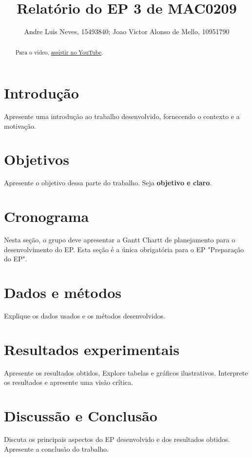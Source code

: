 \documentclass{article}
\title{Relatório do EP 3 de MAC0209}
\author{Andre Luis Neves, 15493840; Joao Victor Alonso de Mello, 10951790}
\begin{document}
\maketitle


\begin{abstract}

Para o video, \href{https://youtube.com}{assistir no YouTube}.

\end{abstract}

\newpage

\tableofcontents

\newpage

\section{Introdução}

Apresente uma introdução ao trabalho desenvolvido, fornecendo o contexto e a motivação.

\section{Objetivos}

Apresente o objetivo dessa parte do trabalho. Seja {\bf objetivo e claro}.

\section{Cronograma}

Nesta seção, o grupo deve apresentar a Gantt Chartt de planejamento para o desenvolvimento do EP. Esta seção é a única obrigatória para o EP "Preparação do EP".

\section{Dados e métodos}

Explique os dados usados e os métodos desenvolvidos.

\section{Resultados experimentais}

Apresente os resultados obtidos, Explore tabelas e gráficos ilustrativos. Interprete os resultados e apresente uma visão crítica.

\section{Discussão e Conclusão}

Discuta os principais aspectos do EP desenvolvido e dos resultados obtidos. Apresente a conclusão do trabalho.
\end{document}
